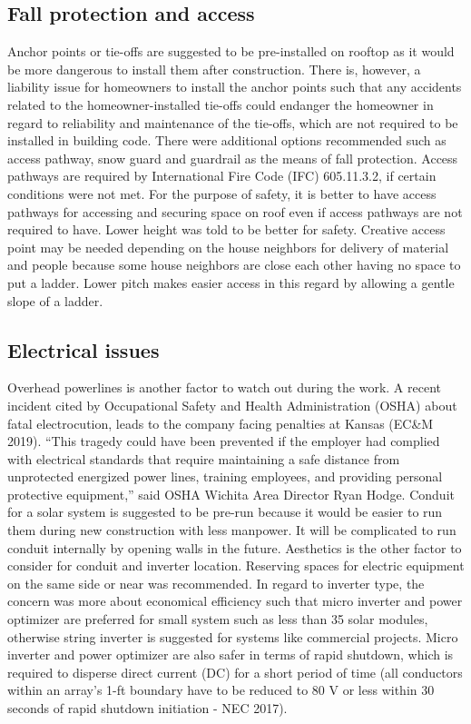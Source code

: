 \documentclass[]{article}
\begin{document}
\hypertarget{fall-protection-and-access}{%
\subsection{Fall protection and
access}\label{fall-protection-and-access}}

Anchor points or tie-offs are suggested to be pre-installed on rooftop
as it would be more dangerous to install them after construction. There
is, however, a liability issue for homeowners to install the anchor
points such that any accidents related to the homeowner-installed
tie-offs could endanger the homeowner in regard to reliability and
maintenance of the tie-offs, which are not required to be installed in
building code. There were additional options recommended such as access
pathway, snow guard and guardrail as the means of fall protection.
Access pathways are required by International Fire Code (IFC)
605.11.3.2, if certain conditions were not met. For the purpose of
safety, it is better to have access pathways for accessing and securing
space on roof even if access pathways are not required to have. Lower
height was told to be better for safety. Creative access point may be
needed depending on the house neighbors for delivery of material and
people because some house neighbors are close each other having no space
to put a ladder. Lower pitch makes easier access in this regard by
allowing a gentle slope of a ladder.

\hypertarget{electrical-issues}{%
\subsection{Electrical issues}\label{electrical-issues}}

Overhead powerlines is another factor to watch out during the work. A
recent incident cited by Occupational Safety and Health Administration
(OSHA) about fatal electrocution, leads to the company facing penalties
at Kansas (EC\&M 2019). ``This tragedy could have been prevented if the
employer had complied with electrical standards that require maintaining
a safe distance from unprotected energized power lines, training
employees, and providing personal protective equipment,'' said OSHA
Wichita Area Director Ryan Hodge. Conduit for a solar system is
suggested to be pre-run because it would be easier to run them during
new construction with less manpower. It will be complicated to run
conduit internally by opening walls in the future. Aesthetics is the
other factor to consider for conduit and inverter location. Reserving
spaces for electric equipment on the same side or near was recommended.
In regard to inverter type, the concern was more about economical
efficiency such that micro inverter and power optimizer are preferred
for small system such as less than 35 solar modules, otherwise string
inverter is suggested for systems like commercial projects. Micro
inverter and power optimizer are also safer in terms of rapid shutdown,
which is required to disperse direct current (DC) for a short period of
time (all conductors within an array's 1-ft boundary have to be reduced
to 80 V or less within 30 seconds of rapid shutdown initiation - NEC
2017).
\end{document}
